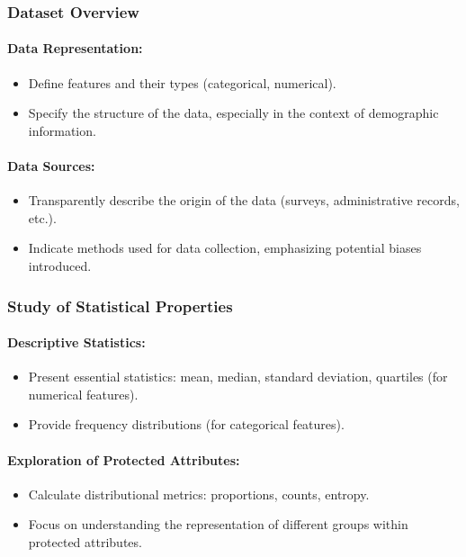\subsubsection{Dataset Overview}

\paragraph{Data Representation:}
\begin{itemize}
    \item Define features and their types (categorical, numerical).
    \item Specify the structure of the data, especially in the context of demographic information.
\end{itemize}

\paragraph{Data Sources:}
\begin{itemize}
    \item Transparently describe the origin of the data (surveys, administrative records, etc.).
    \item Indicate methods used for data collection, emphasizing potential biases introduced.
\end{itemize}

\subsubsection{Study of Statistical Properties}

\paragraph{Descriptive Statistics:}
\begin{itemize}
    \item Present essential statistics: mean, median, standard deviation, quartiles (for numerical features).
    \item Provide frequency distributions (for categorical features).
\end{itemize}

\paragraph{Exploration of Protected Attributes:}
\begin{itemize}
    \item Calculate distributional metrics: proportions, counts, entropy.
    \item Focus on understanding the representation of different groups within protected attributes.
\end{itemize}

